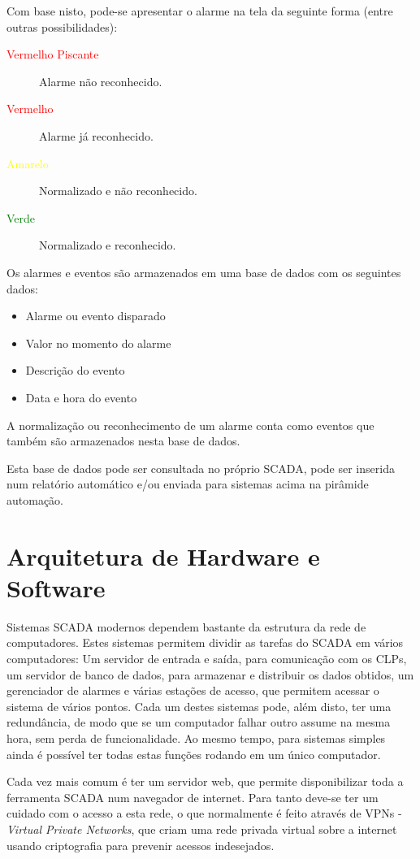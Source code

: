 Com base nisto, pode-se apresentar o alarme na tela da seguinte forma (entre outras possibilidades):
\begin{description}
	\item[\textcolor{red}{Vermelho Piscante}] Alarme não reconhecido.
	\item[\textcolor{red}{Vermelho}] Alarme já reconhecido.
	\item[\textcolor{yellow}{Amarelo}] Normalizado e não reconhecido.
	\item[\textcolor{green}{Verde}] Normalizado e reconhecido.
\end{description}

Os alarmes e eventos são armazenados em uma base de dados com os seguintes dados:
\begin{itemize}
	\item Alarme ou evento disparado
	\item Valor no momento do alarme
	\item Descrição do evento
	\item Data e hora do evento
\end{itemize}

A normalização ou reconhecimento de um alarme conta como eventos que também são armazenados nesta base de dados.

Esta base de dados pode ser consultada no próprio SCADA, pode ser inserida num relatório automático e/ou enviada para sistemas acima na pirâmide automação.

\section{Arquitetura de Hardware e Software}
\label{sec:Arquitetura de Hardware e Software}

Sistemas SCADA modernos dependem bastante da estrutura da rede de computadores. Estes sistemas permitem dividir as tarefas do SCADA em vários computadores: Um servidor de entrada e saída, para comunicação com os CLPs, um servidor de banco de dados, para armazenar e distribuir os dados obtidos, um gerenciador de alarmes e várias estações de acesso, que permitem acessar o sistema de vários pontos.  Cada um destes sistemas pode, além disto, ter uma redundância, de modo que se um computador falhar outro assume na mesma hora, sem perda de funcionalidade. Ao mesmo tempo, para sistemas simples ainda é possível ter todas estas funções rodando em um único computador.

Cada vez mais comum é ter um servidor web, que permite disponibilizar toda a ferramenta SCADA num navegador de internet. Para tanto deve-se ter um cuidado com o acesso a esta rede, o que normalmente é feito através de VPNs - \emph{Virtual Private Networks}, que criam uma rede privada virtual sobre a internet usando criptografia para prevenir acessos indesejados.
